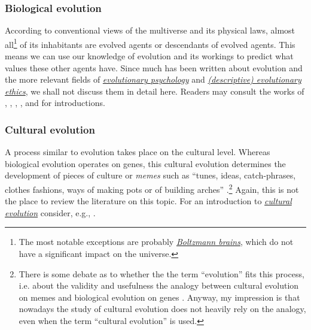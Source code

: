 \subsubsection{Biological evolution}\label{biological-evolution}

According to conventional views of the multiverse and its physical laws,
almost all\footnote{The most notable exceptions are probably
  \href{https://en.wikipedia.org/wiki/Boltzmann_brain}{\emph{Boltzmann
  brains}}, which do not have a significant impact on the universe.} of
its inhabitants are evolved agents or descendants of evolved agents.
This means we can use our knowledge of evolution and its workings to
predict what values these other agents have. Since much has been written
about evolution and the more relevant fields of
\href{https://en.wikipedia.org/wiki/Evolutionary_psychology}{\emph{evolutionary
psychology}} and
\href{https://en.wikipedia.org/wiki/Evolutionary_ethics\#Descriptive_evolutionary_ethics}{\emph{(descriptive)
evolutionary ethics}}, we shall not discuss them in detail here. Readers
may consult the works of \parencite{Pinker1999-dd},
\parencite{Stewart-Williams2015-io},
\parencite{Greene2013-sq},
\parencite{Axelrod2006-ci}, and
\parencite{Buss2015-kp} for introductions.

\subsubsection{Cultural evolution}\label{cultural-evolution}

A process similar to evolution takes place on the cultural level.
Whereas biological evolution operates on genes, this cultural evolution
determines the development of pieces of culture or \emph{memes} such as
``tunes, ideas, catch-phrases, clothes fashions, ways of making pots or
of building arches'' \parencite{Dawkins1976-cd}.\footnote{There
  is some debate as to whether the the term ``evolution'' fits this
  process, i.e. about the validity and usefulness the analogy between
  cultural evolution on memes and biological evolution on genes
  \parencite{Edmonds2005-mi,Kuper_undated-zl,Gil-White2005-wt,Wimsatt1999-fy,Claidiere2012-gz,Atran2001-lb,Pinker1999-dd}.
  Anyway, my impression is that nowadays the study of cultural evolution
  does not heavily rely on the analogy, even when the term ``cultural
  evolution'' is used.} Again, this is not the place to review the
literature on this topic. For an introduction to
\href{https://en.wikipedia.org/wiki/Cultural_evolution}{\emph{cultural
evolution}} consider, e.g., \parencite{Henrich2015-xe}.

